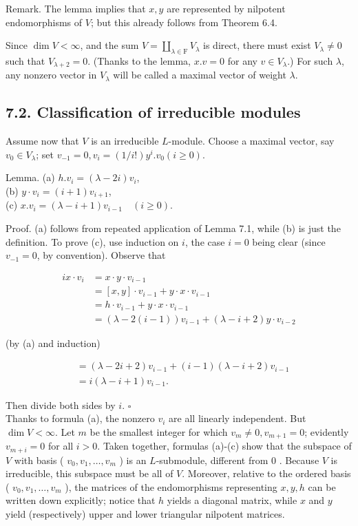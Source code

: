 \documentclass[10pt]{article}
\begin{document}
Remark. The lemma implies that $x, y$ are represented by nilpotent endomorphisms of $V$; but this already follows from Theorem 6.4.

Since $\operatorname{dim} V<\infty$, and the sum $V=\coprod_{\lambda \in \mathrm{F}} V_{\lambda}$ is direct, there must exist $V_{\lambda} \neq 0$ such that $V_{\lambda+2}=0$. (Thanks to the lemma, $x . v=0$ for any $v \in V_{\lambda}$.) For such $\lambda$, any nonzero vector in $V_{\lambda}$ will be called a maximal vector of weight $\lambda$.

\subsection*{7.2. Classification of irreducible modules}
Assume now that $V$ is an irreducible $L$-module. Choose a maximal vector, say $v_{0} \in V_{\lambda}$; set $v_{-1}=0, v_{i}=(1 / i!) y^{i} . v_{0}(i \geq 0)$.

Lemma. (a) $h . v_{i}=(\lambda-2 i) v_{i}$,\\
(b) $y \cdot v_{i}=(i+1) v_{i+1}$,\\
(c) $x . v_{i}=(\lambda-i+1) v_{i-1} \quad(i \geq 0)$.

Proof. (a) follows from repeated application of Lemma 7.1, while (b) is just the definition. To prove (c), use induction on $i$, the case $i=0$ being clear (since $v_{-1}=0$, by convention). Observe that

$$
\begin{aligned}
i x \cdot v_{i} & =x \cdot y \cdot v_{i-1} \\
& =[x, y] \cdot v_{i-1}+y \cdot x \cdot v_{i-1} \\
& =h \cdot v_{i-1}+y \cdot x \cdot v_{i-1} \\
& =(\lambda-2(i-1)) v_{i-1}+(\lambda-i+2) y \cdot v_{i-2}
\end{aligned}
$$

(by (a) and induction)


\begin{align*}
& =(\lambda-2 i+2) v_{i-1}+(i-1)(\lambda-i+2) v_{i-1}  \tag{b}\\
& =i(\lambda-i+1) v_{i-1} .
\end{align*}


Then divide both sides by $i$. $\square$\\
Thanks to formula (a), the nonzero $v_{i}$ are all linearly independent. But $\operatorname{dim} V<\infty$. Let $m$ be the smallest integer for which $v_{m} \neq 0, v_{m+1}=0$; evidently $v_{m+i}=0$ for all $i>0$. Taken together, formulas (a)-(c) show that the subspace of $V$ with basis ( $v_{0}, v_{1}, \ldots, v_{m}$ ) is an $L$-submodule, different from 0 . Because $V$ is irreducible, this subspace must be all of $V$. Moreover, relative to the ordered basis ( $v_{0}, v_{1}, \ldots, v_{m}$ ), the matrices of the endomorphisms representing $x, y, h$ can be written down explicitly; notice that $h$ yields a diagonal matrix, while $x$ and $y$ yield (respectively) upper and lower triangular nilpotent matrices.
\end{document}
